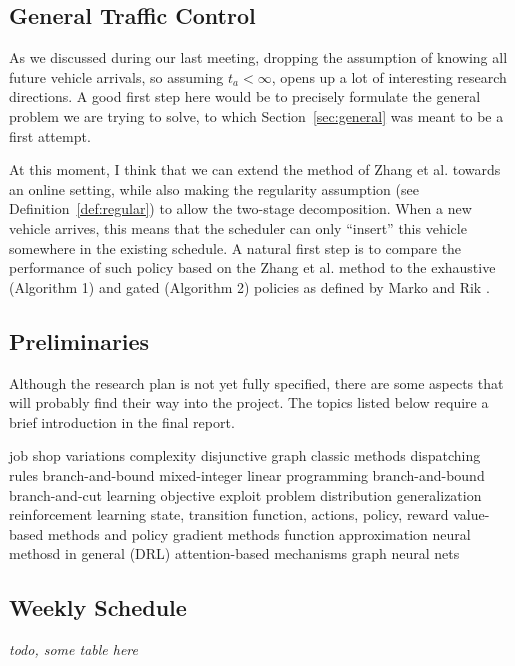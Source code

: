 \documentclass{article}
\theoremstyle{definition}
\theoremstyle{plain}
\begin{document}
\subsection{General Traffic Control}

As we discussed during our last meeting, dropping the assumption of knowing all
future vehicle arrivals, so assuming $t_{a} < \infty$, opens up a lot of
interesting research directions. A good first step here would be to precisely
formulate the general problem we are trying to solve, to which
Section~\ref{sec:general} was meant to be a first attempt.

At this moment, I think that we can extend the method of Zhang et al. towards an
online setting, while also making the regularity assumption (see
Definition~\ref{def:regular}) to allow the two-stage decomposition. When a new
vehicle arrives, this means that the scheduler can only ``insert'' this vehicle
somewhere in the existing schedule. A natural first step is to compare the
performance of such policy based on the Zhang et al. method to the exhaustive
(Algorithm 1) and gated (Algorithm 2) policies as defined by Marko and Rik
\cite{timmermanPlatoonFormingAlgorithms2021}.

\subsection{Preliminaries}

Although the research plan is not yet fully specified, there are some aspects that will probably find their way into the project. The topics listed below require a brief introduction in the final report.
\begin{outline}
\1 job shop
    \2 variations
    \2 complexity
    \2 disjunctive graph
    \2 classic methods
        \3 dispatching rules
        \3 branch-and-bound
\1 mixed-integer linear programming
    \2 branch-and-bound
    \2 branch-and-cut
\1 learning objective \cite{bengioMachineLearningCombinatorial2020}
    \2 exploit problem distribution
    \2 generalization
\1 reinforcement learning
    \2 state, transition function, actions, policy, reward
    \2 value-based methods and policy gradient methods
    \2 function approximation
        \3 neural methosd in general (DRL)
        \3 attention-based mechanisms
        \3 graph neural nets
\end{outline}


\subsection{Weekly Schedule}

\textit{todo, some table here}



\end{document}
